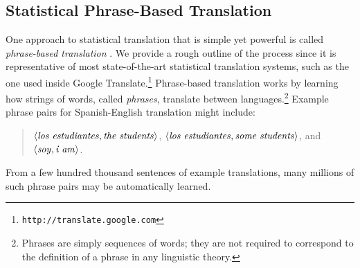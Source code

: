 \subsection{Statistical Phrase-Based Translation}

One approach to statistical translation that is simple yet powerful is
called \emph{phrase-based translation} \cite{Koehn_2003}.  We provide
a rough outline of the process since it is representative of most
state-of-the-art statistical translation systems, such as the one used
inside Google Translate.\footnote{\texttt{http://translate.google.com}}
Phrase-based translation works by learning how strings of words,
called \emph{phrases}, translate between languages.\footnote{Phrases
  are simply sequences of words; they are not required to correspond
  to the definition of a phrase in any linguistic theory.}  Example
phrase pairs for Spanish-English translation might include:

\begin{quote}
$\langle \textrm{\emph{los estudiantes}}, \textrm{\emph{the students}}\rangle$,
$\langle \textrm{\emph{los estudiantes}}, \textrm{\emph{some
    students}}\rangle$, and $\langle \textrm{\emph{soy}},
\textrm{\emph{i am}} \rangle$.
\end{quote}

\noindent From a few hundred thousand sentences
of example translations, many millions of such phrase pairs may be
automatically learned.

